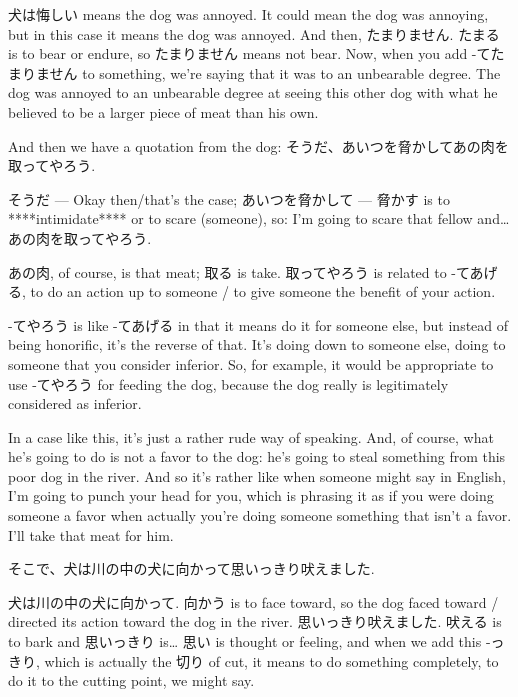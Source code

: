 犬は悔しい means the dog was annoyed. It could mean the dog was annoying, but in this case it means the dog was annoyed. And then, たまりません. たまる is to bear or endure, so たまりません means not bear. Now, when you add -てたまりません to something, we're saying that it was to an unbearable degree. The dog was annoyed to an unbearable degree at seeing this other dog with what he believed to be a larger piece of meat than his own.

\thinrule

And then we have a quotation from the dog: そうだ、あいつを脅かしてあの肉を取ってやろう.

{}

そうだ --- Okay then/that's the case; あいつを脅かして --- 脅かす is to ****intimidate**** or to scare (someone), so: I'm going to scare that fellow and\ldots{} あの肉を取ってやろう.

あの肉, of course, is that meat; 取る is take. 取ってやろう is related to -てあげる, to do an action up to someone / to give someone the benefit of your action.

-てやろう is like -てあげる in that it means do it for someone else, but instead of being honorific, it's the reverse of that. It's doing down to someone else, doing to someone that you consider inferior. So, for example, it would be appropriate to use -てやろう for feeding the dog, because the dog really is legitimately considered as inferior.

In a case like this, it's just a rather rude way of speaking. And, of course, what he's going to do is not a favor to the dog: he's going to steal something from this poor dog in the river. And so it's rather like when someone might say in English, I'm going to punch your head for you, which is phrasing it as if you were doing someone a favor when actually you're doing someone something that isn't a favor. I'll take that meat for him.

そこで、犬は川の中の犬に向かって思いっきり吠えました.

{}

犬は川の中の犬に向かって. 向かう is to face toward, so the dog faced toward / directed its action toward the dog in the river. 思いっきり吠えました. 吠える is to bark and 思いっきり is\ldots{} 思い is thought or feeling, and when we add this -っきり, which is actually the 切り of cut, it means to do something completely, to do it to the cutting point, we might say.

